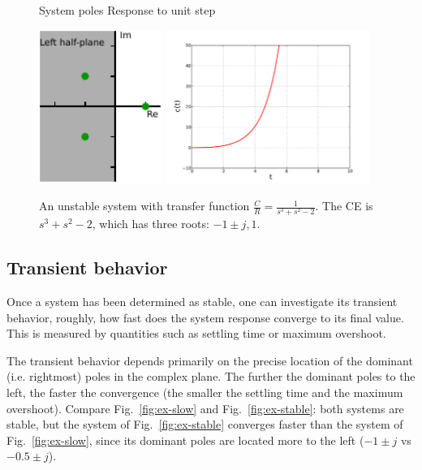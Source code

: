 \documentclass[a4paper,11pt]{report}
\theoremstyle{definition}
\begin{document}
\begin{figure}[H]
  \centering
  \noindent System poles \hspace{2cm} Response to unit step

  \vspace{0.2cm}
  \includegraphics[height=5cm]{fig/stability-no.pdf}
  \includegraphics[height=5cm]{fig/sys-unstable.pdf}
  \caption{An unstable system with transfer function
    $\frac{C}{R}=\frac{1}{s^3+s^2-2}$. The CE is $s^3+s^2-2$,
    which has three roots: $-1\pm j, 1$.}
  \label{fig:ex-unstable}
\end{figure}


\subsection{Transient behavior}

Once a system has been determined as stable, one can investigate its
transient behavior, roughly, how fast does the system response
converge to its final value. This is measured by quantities such as
settling time or maximum overshoot.

The transient behavior depends primarily on the precise location of
the dominant (i.e. rightmost) poles in the complex plane. The further
the dominant poles to the left, the faster the convergence (the
smaller the settling time and the maximum overshoot). Compare
Fig.~\ref{fig:ex-slow} and Fig.~\ref{fig:ex-stable}: both systems are
stable, but the system of Fig.~\ref{fig:ex-stable} converges faster
than the system of Fig.~\ref{fig:ex-slow}, since its dominant poles
are located more to the left ($-1\pm j$ vs $-0.5\pm j$).
\end{document}
